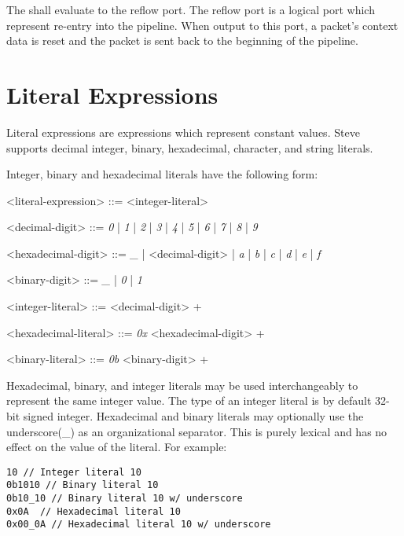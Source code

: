 The  shall evaluate to the reflow port. The reflow port is a logical port which represent re-entry into the pipeline. When output to this port, a packet's context data is reset and the packet is sent back to the beginning of the pipeline.

\section{Literal Expressions} \label{guide:literal_expr}

Literal expressions are expressions which represent constant values. Steve supports decimal integer, binary, hexadecimal, character, and string literals.

Integer, binary and hexadecimal literals have the following form:

\begin{minip}
\begin{grammar}
<literal-expression> ::=
<integer-literal>

<decimal-digit> ::= \textit{0} | \textit{1} | \textit{2} | \textit{3} | \textit{4} | \textit{5} | \textit{6} | \textit{7} | \textit{8} | \textit{9}

<hexadecimal-digit> ::= \textit{\_} | <decimal-digit> | \textit{a} | \textit{b} | \textit{c} | \textit{d} | \textit{e} | \textit{f}             

<binary-digit> ::= \textit{\_} | \textit{0} | \textit{1}

<integer-literal> ::=
<decimal-digit> +

<hexadecimal-literal> ::=
\textit{0x} <hexadecimal-digit> +

<binary-literal> ::=
\textit{0b} <binary-digit> +
\end{grammar}
\end{minip}

Hexadecimal, binary, and integer literals may be used interchangeably to represent the same integer value. The type of an integer literal is by default 32-bit signed integer. Hexadecimal and binary literals may optionally use the underscore(\_) as an organizational separator. This is purely lexical and has no effect on the value of the literal. For example:

\begin{minip}
\begin{lstlisting}
10 // Integer literal 10
0b1010 // Binary literal 10
0b10_10 // Binary literal 10 w/ underscore
0x0A  // Hexadecimal literal 10
0x00_0A // Hexadecimal literal 10 w/ underscore  
\end{lstlisting}
\end{minip}


